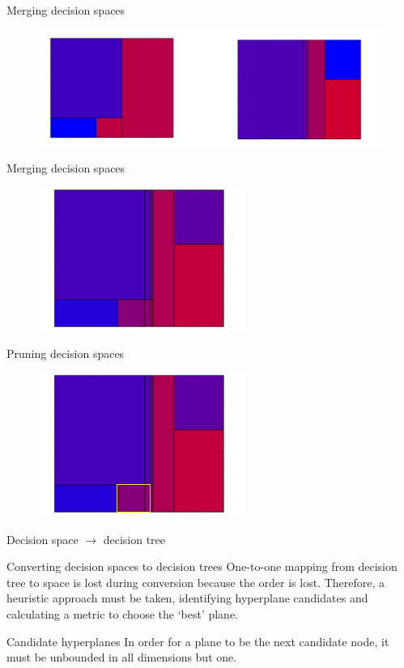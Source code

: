 \documentclass[english]{beamer}
\begin{document}
\begin{frame}{Merging decision spaces}
	\begin{figure}
		\centering
		\includegraphics[width=\textwidth]{figures/merge_space_1.png}
	\end{figure}
\end{frame}

\begin{frame}{Merging decision spaces}
	\begin{figure}
		\centering
		\includegraphics[scale=1]{figures/merge_space_2.png}
	\end{figure}
\end{frame}

\begin{frame}{Pruning decision spaces}
	\begin{figure}
		\centering
		\includegraphics[scale=1]{figures/pruning.png}
	\end{figure}
\end{frame}

\begin{frame}{Decision space $\rightarrow$ decision tree}
	\begin{block}{Converting decision spaces to decision trees}
		One-to-one mapping from decision tree to space is lost during conversion because the order is lost. Therefore, a heuristic approach must be taken, identifying hyperplane candidates and calculating a metric to choose the `best' plane.
	\end{block}
	
	
	\begin{block}{Candidate hyperplanes}
		In order for a plane to be the next candidate node, it must be unbounded in all dimensions but one.
	\end{block}
\end{frame}
\end{document}
